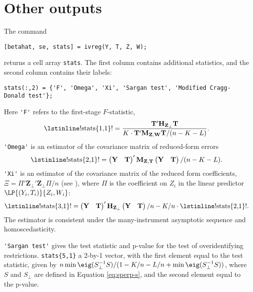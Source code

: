 \documentclass{mynotes}
\newcommand{\by}{\mathbf{Y}} %
\newcommand{\bt}{\mathbf{T}} %
\newcommand{\bz}{\mathbf{Z}} %
\newcommand{\bw}{\mathbf{W}} %
\newcommand{\Hm}[1]{\mathbf{H}_{#1}} %
\newcommand{\Mm}[1]{\mathbf{M}_{#1}} %
\begin{document}
\section{Other outputs}
The command
\begin{lstlisting}
[betahat, se, stats] = ivreg(Y, T, Z, W);
\end{lstlisting}
returns a cell array \lstinline!stats!. The first column contains additional
statistics, and the second column contains their labels:
\begin{lstlisting}
stats(:,2) = {'F', 'Omega', 'Xi', 'Sargan test', 'Modified Cragg-Donald test'};
\end{lstlisting}
Here \lstinline!'F'! refers to the first-stage $F$-statistic,
\begin{equation*}
  \text{\lstinline!stats\{1,1\}!} = \frac{\bt'\Hm{\bz_{\perp}}\bt}{K \cdot\bt'\Mm{\bz,\bw}\bt /(n-K-L)}.
\end{equation*}
\lstinline!'Omega'! is an estimator of the covariance matrix of reduced-form
errors
\begin{equation*}
  \text{\lstinline!stats\{2,1\}!}=
  \begin{pmatrix}
    \by&\bt
  \end{pmatrix}' \Mm{\bz,\bt} \begin{pmatrix}
    \by&\bt
  \end{pmatrix}/(n-K-L).
\end{equation*}
\lstinline!'Xi'! is an estimator of the covariance matrix of the reduced form
coefficients, $\Xi=\Pi'\bz_{\perp}'\bz_{\perp}\Pi/n$ (see
\citet{kolesar12late}), where $\Pi$ is the coefficient on $Z_{i}$ in the linear
predictor $\LP{(Y_{i},T_{i})}{Z_{i},W_{i}}$:
\begin{equation*}
  \text{\lstinline!stats\{3,1\}!}=
  \begin{pmatrix}
    \by&\bt
  \end{pmatrix}' \Hm{\bz_{\perp}} \begin{pmatrix}
    \by&\bt
  \end{pmatrix}/n-K/n\cdot     \text{\lstinline!stats\{2,1\}!}.
\end{equation*}
The estimator is consistent under the many-instrument asymptotic sequence and
homoscedasticity.

\lstinline!'Sargan test'! gives the test statistic and p-value for the
\citet{sargan58} test of overidentifying restrictions. \lstinline!stats{5,1}! a
2-by-1 vector, with the first element equal to the test statistic, given by
$n\min\eig(S_{\perp}^{-1}S)/(1-K/n-L/n+\min\eig(S_{\perp}^{-1}S))$, where $S$
and $S_{\perp}$ are defined in Equation \eqref{eq:sperp-s}, and the second
element equal to the p-value.
\end{document}
